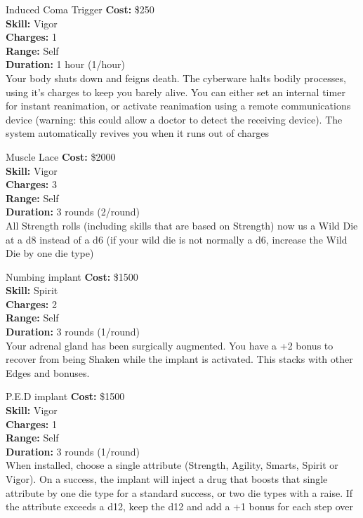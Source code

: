 \begin{multicols}{2}
\begin{genericsection}{Induced Coma Trigger}
\textbf{Cost:} \$250\\
\textbf{Skill:} Vigor\\
\textbf{Charges:} 1\\
\textbf{Range:} Self\\
\textbf{Duration:} 1 hour (1/hour)\\
Your body shuts down and feigns death. The cyberware halts bodily processes, using it's charges to keep you barely alive. You can either set an internal timer for instant reanimation, or activate reanimation using a remote communications device (warning: this could allow a doctor to detect the receiving device). The system automatically revives you when it runs out of charges
\end{genericsection}

\begin{genericsection}{Muscle Lace}
\textbf{Cost:} \$2000\\
\textbf{Skill:} Vigor\\
\textbf{Charges:} 3\\
\textbf{Range:} Self\\
\textbf{Duration:} 3 rounds (2/round)\\
All Strength rolls (including skills that are based on Strength) now us a Wild Die at a d8 instead of a d6 (if your wild die is not normally a d6, increase the Wild Die by one die type)
\end{genericsection}

\begin{genericsection}{Numbing implant}
\textbf{Cost:} \$1500\\
\textbf{Skill:} Spirit\\
\textbf{Charges:} 2\\
\textbf{Range:} Self\\
\textbf{Duration:} 3 rounds (1/round)\\
Your adrenal gland has been surgically augmented. You have a +2 bonus to recover from being Shaken while the implant is activated. This stacks
with other Edges and bonuses.
\end{genericsection}

\begin{genericsection}{P.E.D implant}
\textbf{Cost:} \$1500\\
\textbf{Skill:} Vigor\\
\textbf{Charges:} 1\\
\textbf{Range:} Self\\
\textbf{Duration:} 3 rounds (1/round)\\
When installed, choose a single attribute (Strength, Agility, Smarts, Spirit or Vigor). On a success, the implant will inject a drug that boosts that single attribute by one die type for a standard success, or two die types with a raise. If the attribute exceeds a d12, keep the d12 and add a +1 bonus for each step over
\end{genericsection}


\end{multicols}
